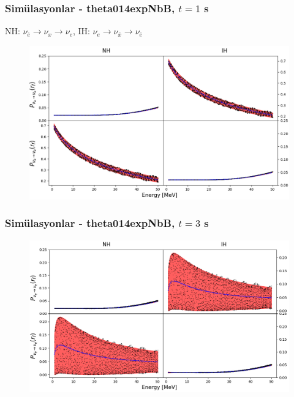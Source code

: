 \documentclass[10pt]{beamer}
\begin{document}
\begin{frame}
    \frametitle{Simülasyonlar - theta014expNbB, $t=1$ s}
    \hrulefill
    \tiny
    
    NH: $\nu_{\bar{e}} \rightarrow \nu_{x} \rightarrow \nu_{e} $, \qquad IH: $\nu_{e} \rightarrow \nu_{\bar{x}} \rightarrow \nu_{\bar{e}} $\\
    \hrulefill
    \normalsize
    \begin{figure}[hbt!]
        \centering
        \includegraphics[width=\textwidth]{fig/theta014expNbB_t1s_energySpec_theta0_averaged.png}
    \end{figure}
\end{frame}

\begin{frame}
    \frametitle{Simülasyonlar - theta014expNbB, $t=3$ s}
    \begin{figure}[hbt!]
        \centering
        \includegraphics[width=\textwidth]{fig/theta014expNbB_t3s_energySpec_theta0_averaged.png}
    \end{figure}
\end{frame}
\end{document}
